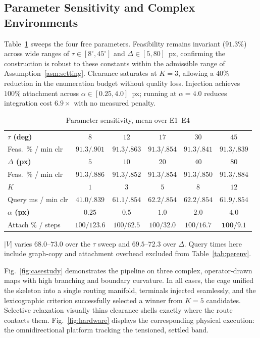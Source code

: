 \documentclass[conference]{IEEEtran}
\begin{document}
\subsection{Parameter Sensitivity and Complex Environments}

Table~\ref{tab:sweep} sweeps the four free parameters. Feasibility remains invariant ($91.3\%$) across wide ranges of $\tau\in[8^\circ,45^\circ]$ and $\Delta\in[5,80]$~px, confirming the construction is robust to these constants within the admissible range of Assumption~\ref{asm:setting}. Clearance saturates at $K=3$, allowing a $40\%$ reduction in the enumeration budget without quality loss. Injection achieves $100\%$ attachment across $\alpha\in[0.25,4.0]$~px; running at $\alpha=4.0$ reduces integration cost $6.9\times$ with no measured penalty.

\begin{table}[htbp]
\caption{Parameter sensitivity, mean over E1--E4}
\label{tab:sweep}
\begin{center}
\setlength{\tabcolsep}{2pt}
\begin{tabular}{@{}lccccc@{}}
\toprule
\textbf{$\tau$ (deg)} & $8$ & $12$ & $17$ & $30$ & $45$ \\
Feas.\ \% / min clr & $91.3/.901$ & $91.3/.863$ & $91.3/.854$ & $91.3/.841$ & $91.3/.839$ \\ \midrule
\textbf{$\Delta$ (px)} & $5$ & $10$ & $20$ & $40$ & $80$ \\
Feas.\ \% / min clr & $91.3/.886$ & $91.3/.852$ & $91.3/.854$ & $91.3/.850$ & $91.3/.884$ \\ \midrule
\textbf{$K$} & $1$ & $3$ & $5$ & $8$ & $12$ \\
Query ms / min clr & $41.0/.839$ & $61.1/.854$ & $62.2/.854$ & $62.2/.854$ & $61.9/.854$ \\ \midrule
\textbf{$\alpha$ (px)} & $0.25$ & $0.5$ & $1.0$ & $2.0$ & $4.0$ \\
Attach \% / steps & $100/123.6$ & $100/62.5$ & $100/32.0$ & $100/16.7$ & $\mathbf{100/9.1}$ \\ \bottomrule
\end{tabular}
\end{center}
\footnotesize $|V|$ varies $68.0$--$73.0$ over the $\tau$ sweep and $69.5$--$72.3$ over $\Delta$. Query times here include graph-copy and attachment overhead excluded from Table~\ref{tab:perenv}.
\end{table}

Fig.~\ref{fig:casestudy} demonstrates the pipeline on three complex, operator-drawn maps with high branching and boundary curvature. In all cases, the cage unified the skeleton into a single routing manifold, terminals injected seamlessly, and the lexicographic criterion successfully selected a winner from $K=5$ candidates. Selective relaxation visually thins clearance shells exactly where the route contacts them. Fig.~\ref{fig:hardware} displays the corresponding physical execution: the omnidirectional platform tracking the tensioned, settled band.
\end{document}
